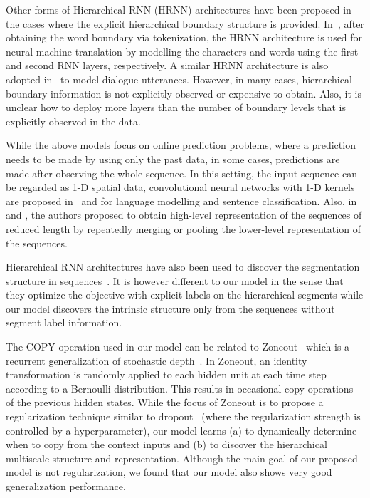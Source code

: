 Other forms of Hierarchical RNN (HRNN) architectures have been proposed in the cases where the explicit hierarchical boundary structure is provided. 
In~\citet{ling2015character}, after obtaining the word boundary via tokenization, the HRNN architecture is used for neural machine translation by modelling the characters and words using the first and second RNN layers, respectively. A similar HRNN architecture is also adopted in~\citet{sordoni2015hierarchical} to model dialogue utterances. However, in many cases, hierarchical boundary information is not explicitly observed or expensive to obtain. Also, it is unclear how to deploy more layers than the number of boundary levels that is explicitly observed in the data.

While the above models focus on online prediction problems, where a prediction needs to be made by using only the past data, in some cases, predictions are made after observing the whole sequence. In this setting, the input sequence can be regarded as 1-D spatial data, convolutional neural networks with 1-D kernels are proposed in~\citet{kim2014convolutional} and \citet{kim2015character} 
for language modelling and sentence classification. Also, in~\citet{chan2016listen} and \citet{bahdanau2016end}, the authors proposed to obtain high-level representation of the sequences of reduced length by repeatedly merging or pooling the lower-level representation of the sequences.

Hierarchical RNN architectures have also been used to discover the segmentation structure in sequences~\citep{fernandez2007sequence,kong2015segmental}. It is however different to our model in the sense that they optimize the objective with explicit labels on the hierarchical segments while our model discovers the intrinsic structure only from the sequences without segment label information.

The COPY operation used in our model can be related to Zoneout~\citep{krueger2016zoneout} which is a recurrent generalization of stochastic depth~\citep{huang2016deep}. In Zoneout, an identity transformation is randomly applied to each hidden unit at each time step according to a Bernoulli distribution. This results in occasional copy operations of the previous hidden states. While the focus of Zoneout is to propose a regularization technique similar to dropout~\citep{srivastava2014dropout} (where the regularization strength is controlled by a hyperparameter), our model learns (a) to dynamically determine when to copy from the context inputs and (b) to discover the hierarchical multiscale structure and representation. Although the main goal of our proposed model is not regularization, we found that our model also shows very good generalization performance.

